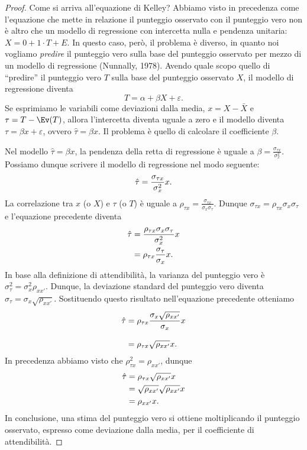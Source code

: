 \begin{proof}

Come si arriva all'equazione di Kelley? 
Abbiamo visto in precedenza come l'equazione che mette in relazione il punteggio osservato con il punteggio vero non è altro che un modello di regressione con intercetta nulla e pendenza unitaria: $X = 0 + 1 \cdot T + E$.
In questo caso, però, il problema è diverso, in quanto noi vogliamo \emph{predire} il punteggio vero sulla base del punteggio osservato per mezzo di un modello di regressione (Nunnally, 1978). 
Avendo quale scopo quello di \enquote{predire} il punteggio vero $T$ sulla base del punteggio osservato $X$, il modello di regressione diventa
$$
T = \alpha + \beta X + \varepsilon.
$$
Se esprimiamo le variabili come deviazioni dalla  media, $x = X - \bar{X}$ e $\tau = T - \Ev(T)$, allora l'intercetta diventa uguale a zero e il modello diventa
$
\tau = \beta x + \varepsilon
$, 
ovvero
$
\hat{\tau} = \beta x. 
$
Il problema è quello di calcolare il coefficiente $\beta$.
 
Nel modello $\hat{\tau} = \beta x$, la pendenza della retta di regressione è uguale a
$\beta = \frac{\sigma_{\tau x}}{\sigma^2_x}$. 
Possiamo dunque scrivere il modello di regressione nel modo seguente:
\begin{equation}
\hat{\tau} = \frac{\sigma_{\tau x}}{\sigma^2_x} x.\notag
\label{eq:hat_t_1}
\end{equation}
La correlazione tra $x$ (o $X$) e $\tau$ (o $T$) è uguale a $\rho_{\tau x} =
  \frac{\sigma_{\tau x}}{\sigma_x \sigma_{\tau}}$. 
Dunque  $\sigma_{\tau x} =
  \rho_{\tau x}\sigma_x \sigma_{\tau}$ e l'equazione precedente diventa
\begin{align}
\hat{\tau} %
&= \frac{\rho_{\tau x}\sigma_x \sigma_{\tau}}{\sigma^2_x} x  \notag\\
&= \rho_{\tau x}\frac{\sigma_{\tau}}{\sigma_x} x. \notag
\label{eq:hat_t_2}
\end{align}
In base alla definizione di attendibilità, la varianza del punteggio vero è  
$
\sigma^2_{\tau} = \sigma^2_x \rho_{xx'}
$. 
Dunque, la deviazione standard del punteggio vero diventa 
$
\sigma_{\tau} = \sigma_x \sqrt{\rho_{xx'}}
$. 
Sostituendo questo risultato nell'equazione precedente otteniamo
\begin{align}
\hat{\tau} &= \rho_{\tau x}\frac{\sigma_x \sqrt{\rho_{xx'}}}{\sigma_x} x
\notag\\[8pt]
&=  \rho_{\tau x}  \sqrt{\rho_{xx'}} x. \notag
\end{align}
In precedenza abbiamo visto che $\rho^2_{\tau x} = \rho_{xx'}$, dunque
\begin{align}
\hat{\tau} &= \rho_{\tau x} \sqrt{\rho_{xx'}} x \notag\\
        &= \sqrt{\rho_{xx'}} \sqrt{\rho_{xx'}} x \notag\\
        &= \rho_{xx'} x.
\end{align}
In conclusione, una stima del punteggio vero si ottiene moltiplicando il punteggio osservato, espresso come deviazione dalla media, per il coefficiente di attendibilità.


\end{proof}

